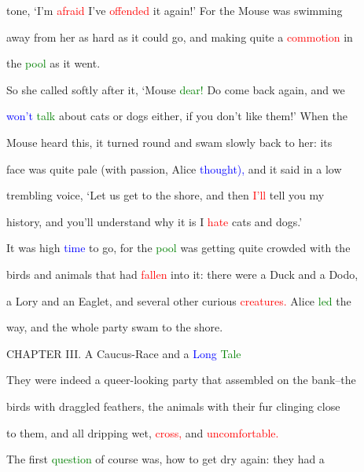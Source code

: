  tone, ‘I’m \textcolor{red}{afraid} I’ve \textcolor{red}{offended} it again!’ For the Mouse was \textcolor{BurntOrange}{swimming}

 away from her as hard as it could go, and making quite a \textcolor{red}{commotion} in

 the \textcolor{green}{pool} as it went.



 So she called softly after it, ‘Mouse \textcolor{green}{dear!} Do come back again, and we

 \textcolor{blue}{won’t} \textcolor{green}{talk} about cats or dogs either, if you don’t like them!’ When the

 Mouse heard this, it turned round and swam slowly back to her: its

 face was quite pale (with \textcolor{BurntOrange}{passion,} Alice \textcolor{blue}{thought),} and it said in a low

 trembling voice, ‘Let us get to the shore, and then \textcolor{red}{I’ll} tell you my

 history, and you’ll understand why it is I \textcolor{red}{hate} cats and dogs.’



 It was high \textcolor{blue}{time} to go, for the \textcolor{green}{pool} was getting quite crowded with the

 birds and animals that had \textcolor{red}{fallen} into it: there were a Duck and a Dodo,

 a Lory and an Eaglet, and several other curious \textcolor{red}{creatures.} Alice \textcolor{green}{led} the

 way, and the whole party swam to the shore.









 CHAPTER III. A Caucus-Race and a \textcolor{blue}{Long} \textcolor{green}{Tale}



 They were indeed a queer-looking party that assembled on the bank--the

 birds with draggled feathers, the animals with their fur clinging close

 to them, and all dripping wet, \textcolor{red}{cross,} and \textcolor{red}{uncomfortable.}



 The first \textcolor{green}{question} of course was, how to get dry again: they had a

